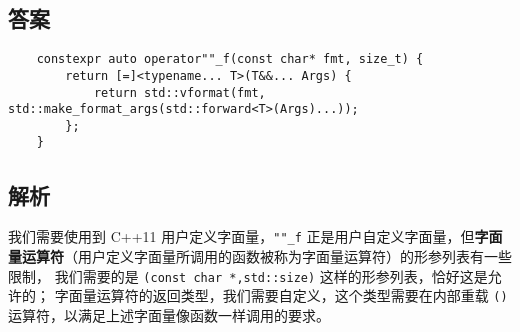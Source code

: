 

\subsection{答案}

\begin{verbatim}
    constexpr auto operator""_f(const char* fmt, size_t) {
        return [=]<typename... T>(T&&... Args) { 
            return std::vformat(fmt, std::make_format_args(std::forward<T>(Args)...));
        };
    }
\end{verbatim}

\subsection{解析}


我们需要使用到 C++11 用户定义字面量，\texttt{""_f} 正是用户自定义字面量，但\textbf{字面量运算符}（用户定义字面量所调用的函数被称为字面量运算符）的形参列表有一些限制，
我们需要的是 \texttt{(const char *,std::size)} 这样的形参列表，恰好这是允许的；
字面量运算符的返回类型，我们需要自定义，这个类型需要在内部重载 \texttt{()} 运算符，以满足上述字面量像函数一样调用的要求。
